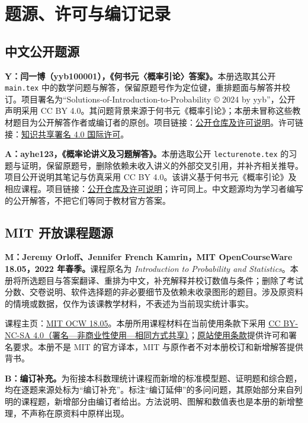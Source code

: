 \documentclass[12pt,fontset=fandol]{ctexart}
\begin{document}
\clearpage
\section*{题源、许可与编订记录}
\subsection*{中文公开题源}
\textbf{Y：闫一博（yyb100001），《何书元〈概率引论〉答案》。}本册选取其公开 \texttt{main.tex} 中的数学问题与解答，保留原题号作为定位键，重排题面与解答并校订。项目署名为“Solutions-of-Introduction-to-Probability © 2024 by yyb”，公开声明采用 CC BY 4.0。其问题背景来源于何书元《概率引论》；本册未冒称这些教材题目为公开解答作者或编订者的原创。项目链接：\href{https://github.com/yyb100001/Solutions-of-Introduction-to-Probability}{公开仓库及许可说明}。许可链接：\href{https://creativecommons.org/licenses/by/4.0/}{知识共享署名 4.0 国际许可}。

\textbf{A：ayhe123，《概率论讲义及习题解答》。}本册选取公开 \texttt{lecturenote.tex} 的习题与证明，保留原题号，删除依赖未收入讲义的外部交叉引用，并补齐相关推导。项目公开说明其笔记与仿真采用 CC BY 4.0。该讲义基于何书元《概率引论》及相应课程。项目链接：\href{https://github.com/ayhe123/probabilityTheory-lecturenote}{公开仓库及许可说明}；许可同上。中文题源均为学习者编写的公开解答，不把它们等同于教材官方答案。

\subsection*{MIT 开放课程题源}
\textbf{M：Jeremy Orloff、Jennifer French Kamrin，MIT OpenCourseWare 18.05，2022 年春季。}课程原名为 \emph{Introduction to Probability and Statistics}。本册将所选题目与答案翻译、重排为中文，补充解释并校订数值与条件；删除了考试分数、交卷说明、软件选择题的非必要细节及依赖未收录图形的题目。涉及原资料的情境或数据，仅作为该课教学材料，不表述为当前现实统计事实。

课程主页：\href{https://ocw.mit.edu/courses/18-05-introduction-to-probability-and-statistics-spring-2022/}{MIT OCW 18.05}。本册所用课程材料在当前使用条款下采用 \href{https://creativecommons.org/licenses/by-nc-sa/4.0/}{CC BY-NC-SA 4.0（署名—非商业性使用—相同方式共享）}；\href{https://ocw.mit.edu/pages/privacy-and-terms-of-use/}{原站使用条款}提供许可和署名要求。本册不是 MIT 的官方译本，MIT 与原作者不对本册校订和新增解答提供背书。

\textbf{B：编订补充。}为衔接本科数理统计课程而新增的标准模型题、证明题和综合题，均在逐题来源处标为“编订补充”。标注“编订延伸”的多问问题，其原始部分来自列明的课程题，新增部分由编订者给出。方法说明、图解和数值表也是本册的新增整理，不声称在原资料中原样出现。
\end{document}
